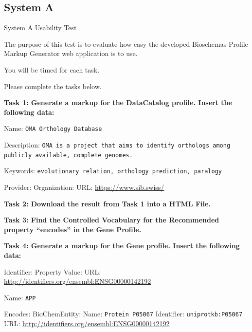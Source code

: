 \subsection*{System A}
{
{\color{blue}System A Usability Test}

\noindent
The purpose of this test is to evaluate how easy the developed Bioschemas Profile Markup Generator web application is to use. 

\noindent
You will be timed for each task.

\noindent
Please complete the tasks below.

\noindent
\textbf{Task 1: Generate a markup for the DataCatalog profile. Insert the following data:}

\noindent
Name:\newline
\texttt{OMA Orthology Database}

\noindent
Description:\newline
\texttt{OMA is a project that aims to identify orthologs among publicly available, complete genomes.}

\noindent
Keywords:\newline
\texttt{evolutionary relation, orthology prediction, paralogy}

\noindent
Provider:\newline
\hspace*{35pt}Organization:\newline
\hspace*{70pt}URL: \url{https://www.sib.swiss/}

\noindent
\textbf{Task 2: Download the result from Task 1 into a HTML File.}

\noindent
\textbf{Task 3: Find the Controlled Vocabulary for the Recommended property “encodes” in the Gene Profile.}

\noindent
\textbf{Task 4: Generate a markup for the Gene profile. Insert the following data:}


\noindent
Identifier:\newline
\hspace*{35pt}Property Value:\newline
\hspace*{70pt}URL: \url{http://identifiers.org/ensembl:ENSG00000142192}

\noindent
Name:\newline
\texttt{APP}

\noindent
Encodes:\newline
\hspace*{35pt}BioChemEntity:\newline
\hspace*{70pt}Name: \texttt{Protein P05067}\newline
\hspace*{70pt}Identifier: \texttt{uniprotkb:P05067}\newline
\hspace*{70pt}URL: \url{http://identifiers.org/ensembl:ENSG00000142192}

}


